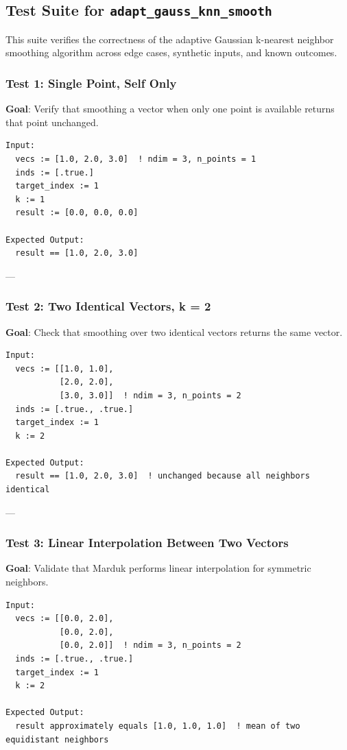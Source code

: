 \documentclass{article}
\begin{document}
\subsection{Test Suite for \texttt{adapt\_gauss\_knn\_smooth}}

This suite verifies the correctness of the adaptive Gaussian k-nearest neighbor smoothing algorithm across edge cases, synthetic inputs, and known outcomes.

\subsubsection*{Test 1: Single Point, Self Only}

\textbf{Goal}: Verify that smoothing a vector when only one point is available returns that point unchanged.

\begin{verbatim}
Input:
  vecs := [1.0, 2.0, 3.0]  ! ndim = 3, n_points = 1
  inds := [.true.]
  target_index := 1
  k := 1
  result := [0.0, 0.0, 0.0]

Expected Output:
  result == [1.0, 2.0, 3.0]
\end{verbatim}

---

\subsubsection*{Test 2: Two Identical Vectors, k = 2}

\textbf{Goal}: Check that smoothing over two identical vectors returns the same vector.

\begin{verbatim}
Input:
  vecs := [[1.0, 1.0],
           [2.0, 2.0],
           [3.0, 3.0]]  ! ndim = 3, n_points = 2
  inds := [.true., .true.]
  target_index := 1
  k := 2

Expected Output:
  result == [1.0, 2.0, 3.0]  ! unchanged because all neighbors identical
\end{verbatim}

---

\subsubsection*{Test 3: Linear Interpolation Between Two Vectors}

\textbf{Goal}: Validate that Marduk performs linear interpolation for symmetric neighbors.

\begin{verbatim}
Input:
  vecs := [[0.0, 2.0],
           [0.0, 2.0],
           [0.0, 2.0]]  ! ndim = 3, n_points = 2
  inds := [.true., .true.]
  target_index := 1
  k := 2

Expected Output:
  result approximately equals [1.0, 1.0, 1.0]  ! mean of two equidistant neighbors
\end{verbatim}
\end{document}
